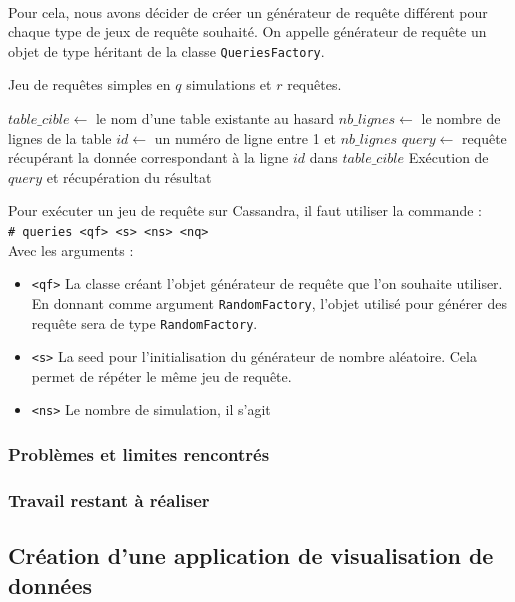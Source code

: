 \documentclass[12pt]{article}
\newcommand{\class}[1]{\texttt{#1}}
\newcommand{\shellcmd}[1]{\\\indent\indent\texttt{\footnotesize\# #1}\\}
\begin{document}
\paragraph{} Pour cela, nous avons décider de créer un générateur de requête différent pour chaque type de jeux de requête souhaité.
On appelle générateur de requête un objet de type héritant de la classe \class{QueriesFactory}.




\begin{algorithm}[H]
\caption{Jeu de requêtes simples en $q$ simulations et $r$ requêtes.}
\begin{algorithmic}[1]
\State $table\_cible \gets $ le nom d'une table existante au hasard
\State $nb\_lignes \gets $ le nombre de lignes de la table
\State $id \gets $ un numéro de ligne entre 1 et $nb\_lignes$ 
\State $query \gets$ requête récupérant la donnée correspondant à la ligne $id$ dans $table\_cible$
\State Exécution de $query$ et récupération du résultat
\EndFor
\EndFor
\end{algorithmic}
\end{algorithm}


Pour exécuter un jeu de requête sur Cassandra, il faut utiliser la commande :
\shellcmd{queries <qf> <s> <ns> <nq>}
Avec les arguments :
\begin{itemize}
 \item \texttt{<qf>} La classe créant l'objet générateur de requête que l'on souhaite utiliser. En donnant comme argument \class{RandomFactory}, l'objet utilisé pour générer des requête sera de type \class{RandomFactory}.
 \item \texttt{<s>} La seed pour l'initialisation du générateur de nombre aléatoire. Cela permet de répéter le même jeu de requête.
 \item \texttt{<ns>} Le nombre de simulation, il s'agit
\end{itemize}


\subsubsection*{Problèmes et limites rencontrés}
\subsubsection*{Travail restant à réaliser}

\subsection{Création d'une application de visualisation de données}
\end{document}
